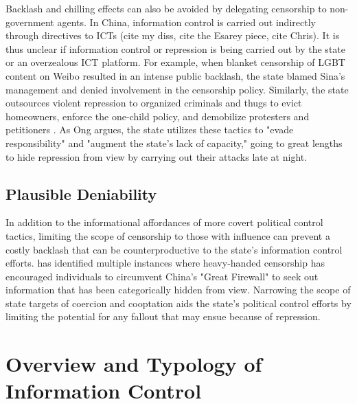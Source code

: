 \documentclass[11pt]{article}
\begin{document}
Backlash and chilling effects can also be avoided by delegating censorship to non-government agents. In China, information control is carried out indirectly through directives to ICTs (cite my diss, cite the Esarey piece, cite Chris). It is thus unclear if information control or repression is being carried out by the state or an overzealous ICT platform. For example, when blanket censorship of LGBT content on Weibo resulted in an intense public backlash, the state blamed Sina's management and denied involvement in the censorship policy. Similarly, the state outsources violent repression to organized criminals and thugs to evict homeowners, enforce the one-child policy, and demobilize protesters and petitioners \citep{ong2018thugs}. As Ong argues, the state utilizes these tactics to "evade responsibility" and "augment the state's lack of capacity," going to great lengths to hide repression from view by carrying out their attacks late at night.



\subsection{Plausible Deniability}

In addition to the informational affordances of more covert political control tactics, limiting the scope of censorship to those with influence can prevent a costly backlash that can be counterproductive to the state's information control efforts. \cite{roberts2015experiencing,roberts2017censorship} has identified multiple instances where heavy-handed censorship has encouraged individuals to circumvent China's "Great Firewall" to seek out information that has been categorically hidden from view. Narrowing the scope of state targets of coercion and cooptation aids the state's political control efforts by limiting the potential for any fallout that may ensue because of repression.

\section{Overview and Typology of Information Control}\label{types_info_ctrl}
\end{document}
